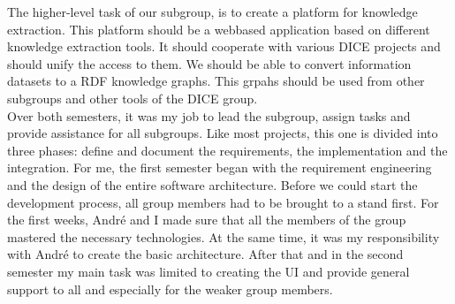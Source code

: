 The higher-level task of our subgroup, is to create a platform for knowledge extraction. This platform should be a webbased application based on different knowledge extraction tools. It should cooperate with various DICE projects and should unify the access to them. We should be able to convert information datasets to a RDF knowledge graphs. This grpahs should be used from other subgroups and other tools of the DICE group.\\

Over both semesters, it was my job to lead the subgroup, assign tasks and provide assistance for all subgroups. Like most projects, this one is divided into three phases: define and document the requirements, the implementation and the integration. For me, the first semester began with the requirement engineering and the design of the entire software architecture. Before we could start the development process, all group members had to be brought to a stand first. For the first weeks, André and I made sure that all the members of the group mastered the necessary technologies. At the same time, it was my responsibility with André to create the basic architecture. After that and in the second semester my main task was limited to creating the UI and provide general support to all and especially for the weaker group members.